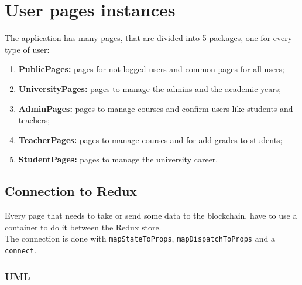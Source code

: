 \documentclass[../react.tex]{subfiles}
\begin{document}
	
	\section{User pages instances}
	The application has many pages, that are divided into 5 packages, one for every type of user:
	\begin{enumerate}
		\item \textbf{PublicPages: } pages for not logged users and common pages for all users;
		\item \textbf{UniversityPages: } pages to manage the admins and the academic years;
		\item \textbf{AdminPages: } pages to manage courses and confirm users like students and teachers;
		\item \textbf{TeacherPages: } pages to manage courses and for add grades to students;
		\item \textbf{StudentPages: } pages to manage the university career.
	\end{enumerate}

	\subsection{Connection to Redux}
	Every page that needs to take or send some data to the blockchain, have to use a container to do it between the Redux store.\\
	The connection is done with \texttt{mapStateToProps}, \texttt{mapDispatchToProps} and a \texttt{connect}.\\

	\subsubsection{UML}
\end{document}
